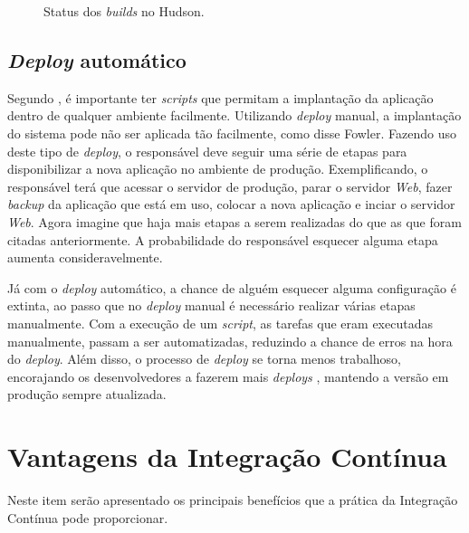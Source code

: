 \begin{figure}[ht]
    \centering
    \caption{Status dos \textit{builds} no Hudson.}
    \label{hudson}
\end{figure}

\subsection{\textit{Deploy} automático}

Segundo , é importante ter \textit{scripts} que permitam a implantação da aplicação dentro de qualquer ambiente facilmente. Utilizando \textit{deploy} manual, a implantação do sistema pode não ser aplicada tão facilmente, como disse Fowler. Fazendo uso deste tipo de \textit{deploy}, o responsável deve seguir uma série de etapas para disponibilizar a nova aplicação no ambiente de produção. Exemplificando, o responsável terá que acessar o servidor de produção, parar o servidor \textit{Web}, fazer \textit{backup} da aplicação que está em uso, colocar a nova aplicação e inciar o servidor \textit{Web}. Agora imagine que haja mais etapas a serem realizadas do que as que foram citadas anteriormente. A probabilidade do responsável esquecer alguma etapa aumenta consideravelmente.

Já com o \textit{deploy} automático, a chance de alguém esquecer alguma configuração é extinta, ao passo que no \textit{deploy} manual é necessário realizar várias etapas manualmente. Com a execução de um \textit{script}, as tarefas que eram executadas manualmente, passam a ser automatizadas, reduzindo a chance de erros na hora do \textit{deploy}. Além disso, o processo de \textit{deploy} se torna menos trabalhoso, encorajando os desenvolvedores a fazerem mais \textit{deploys} , mantendo a versão em produção sempre atualizada.

\section{Vantagens da Integração Contínua}

Neste item serão apresentado os principais benefícios que a prática da Integração Contínua pode proporcionar.

